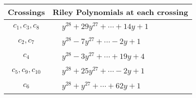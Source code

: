 \documentclass[1p]{elsarticle_modified}
\theoremstyle{definition}
\begin{document}
\begin{tabular}{m{50pt}|m{274pt}}
Crossings & \hspace{64pt}Riley Polynomials at each crossing \\
\hline $$\begin{aligned}c_{1},c_{3},c_{8}\end{aligned}$$&$\begin{aligned}
&y^{28}+29 y^{27}+\cdots+14 y+1
\end{aligned}$\\
\hline $$\begin{aligned}c_{2},c_{7}\end{aligned}$$&$\begin{aligned}
&y^{28}-7 y^{27}+\cdots-2 y+1
\end{aligned}$\\
\hline $$\begin{aligned}c_{4}\end{aligned}$$&$\begin{aligned}
&y^{28}-3 y^{27}+\cdots+19 y+4
\end{aligned}$\\
\hline $$\begin{aligned}c_{5},c_{9},c_{10}\end{aligned}$$&$\begin{aligned}
&y^{28}+25 y^{27}+\cdots-2 y+1
\end{aligned}$\\
\hline $$\begin{aligned}c_{6}\end{aligned}$$&$\begin{aligned}
&y^{28}+y^{27}+\cdots+62 y+1
\end{aligned}$\\
\hline
\end{tabular}
\vskip 2pc
\end{document}
